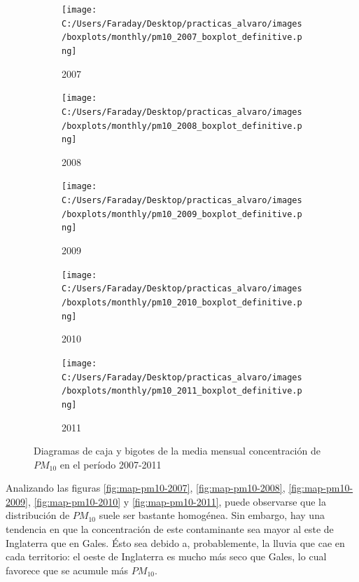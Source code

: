 \documentclass[12pt]{article}
\begin{document}
\begin{figure}[H]
\centering
\begin{subfigure}[H]{0.30\textwidth}
\texttt{[image: C:/Users/Faraday/Desktop/practicas\_alvaro/images/boxplots/monthly/pm10\_2007\_boxplot\_definitive.png]}
\captionsetup{labelformat=empty}
\caption{2007}
\label{fig:box-pm10-2007}
\end{subfigure}
%
\begin{subfigure}[H]{0.30\textwidth}
\texttt{[image: C:/Users/Faraday/Desktop/practicas\_alvaro/images/boxplots/monthly/pm10\_2008\_boxplot\_definitive.png]}
\captionsetup{labelformat=empty}
\caption{2008}
\label{fig:box-pm10-2008}
\end{subfigure}
%
\begin{subfigure}[H]{0.30\textwidth}
\texttt{[image: C:/Users/Faraday/Desktop/practicas\_alvaro/images/boxplots/monthly/pm10\_2009\_boxplot\_definitive.png]}
\captionsetup{labelformat=empty}
\caption{2009}
\label{fig:box-pm10-2009}
\end{subfigure}

\begin{subfigure}[H]{0.30\textwidth}
\texttt{[image: C:/Users/Faraday/Desktop/practicas\_alvaro/images/boxplots/monthly/pm10\_2010\_boxplot\_definitive.png]}
\captionsetup{labelformat=empty}
\caption{2010}
\label{fig:box-pm10-2010}
\end{subfigure}
%
\begin{subfigure}[H]{0.30\textwidth}
\texttt{[image: C:/Users/Faraday/Desktop/practicas\_alvaro/images/boxplots/monthly/pm10\_2011\_boxplot\_definitive.png]}
\captionsetup{labelformat=empty}
\caption{2011}
\label{fig:box-pm10-2011}
\end{subfigure}
\caption{Diagramas de caja y bigotes de la media mensual concentración de $PM_{10}$ en el período 2007-2011}
\label{fig:box-pm10-monthly}
\end{figure}

Analizando las figuras \ref{fig:map-pm10-2007}, \ref{fig:map-pm10-2008}, \ref{fig:map-pm10-2009}, \ref{fig:map-pm10-2010} y \ref{fig:map-pm10-2011}, puede observarse que la distribución de $PM_{10}$ suele ser bastante homogénea. Sin embargo, hay una tendencia en que la concentración de este contaminante sea mayor al este de Inglaterra que en Gales. Ésto sea debido a, probablemente, la lluvia que cae en cada territorio: el oeste de Inglaterra es mucho más seco que Gales, lo cual favorece que se acumule más $PM_{10}$.
\end{document}
